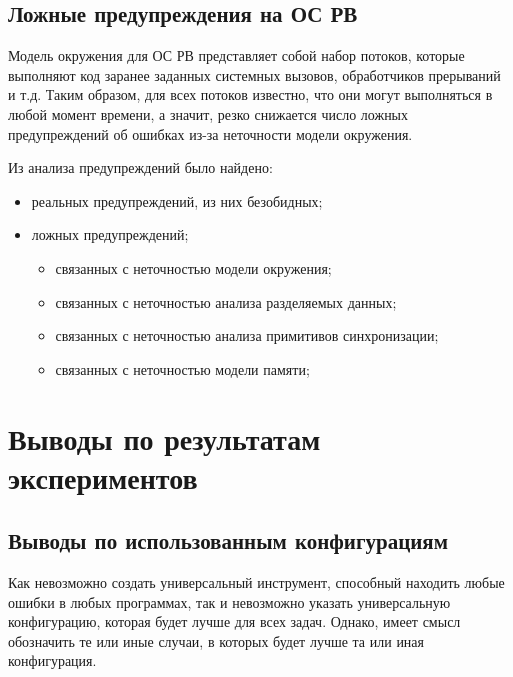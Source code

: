 \subsection{Ложные предупреждения на ОС РВ}

Модель окружения для ОС РВ представляет собой набор потоков, которые выполняют код заранее заданных системных вызовов, обработчиков прерываний и т.д.
Таким образом, для всех потоков известно, что они могут выполняться в любой момент времени, а значит, резко снижается число ложных предупреждений об ошибках из-за неточности модели окружения.




Из анализа  предупреждений было найдено:
\begin{itemize}
\item {} реальных предупреждений, из них  безобидных;
\item {} ложных предупреждений;
\begin{itemize}
\item {} связанных с неточностью модели окружения;
\item {} связанных с неточностью анализа разделяемых данных;
\item {} связанных с неточностью анализа примитивов синхронизации;
\item {} связанных с неточностью модели памяти;
\end{itemize}
\end{itemize}


\section{Выводы по результатам экспериментов}

\subsection{Выводы по использованным конфигурациям}

Как невозможно создать универсальный инструмент, способный находить любые ошибки в любых программах, так и невозможно указать универсальную конфигурацию, которая будет лучше для всех задач. 
Однако, имеет смысл обозначить те или иные случаи, в которых будет лучше та или иная конфигурация.

